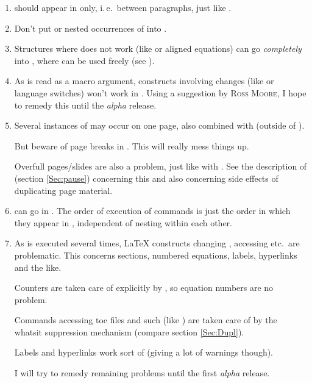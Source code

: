 \documentclass[12pt]{scrartcl}
\let\name=\textsc
\let\newslide=\relax
\begin{document}
  \begin{enumerate}
  \item {} should appear in  only, i.\,e.\ between paragraphs, just like
    .

  \item Don't put  or nested occurrences of  into .

  \item Structures where  does not work (like  or aligned equations) can go
    \emph{completely} into , where  can be used freely (see ).

  \item As  is read as a macro argument, constructs involving  changes (like
     or language switches) won't work in . Using a suggestion by \name{Ross
      Moore}, I hope to remedy this until the \emph{alpha} release.

\newslide

  \item Several instances of  may occur on one page, also combined with  (outside
    of ).

    But beware of page breaks in . This will really mess things up.

    Overfull pages/slides are also a problem, just like with . See the description of 
    (section \ref{Sec:pause}) concerning this and also concerning side effects of duplicating page material.

  \item {} can go in . The order of execution of  commands is just the
    order in which they appear in , independent of nesting within each other.

    \newslide

  \item As  is executed several times, \LaTeX{} constructs changing , accessing
     etc.\ are problematic. This concerns sections, numbered equations, labels, hyperlinks and the like.

    Counters are taken care of explicitly by , so equation numbers are no problem.

    Commands accessing toc files and such (like ) are taken care of by the whatsit suppression
    mechanism (compare section \ref{Sec:Dupl}).

    Labels and hyperlinks work sort of (giving a lot of warnings though).

    I will try to remedy remaining problems until the first \emph{alpha} release.
  \end{enumerate}
\end{document}
